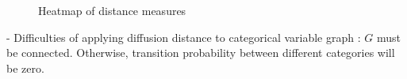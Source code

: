 \documentclass[12pt]{report}
\begin{document}
 
\begin{figure}[H]
\captionsetup{format=plain}
\centering
{}
\caption{Heatmap of distance measures}
\label{fig:dist}    
\end{figure} 
 
  
- Difficulties of applying diffusion distance to categorical variable graph : $G$ must be connected. Otherwise, transition probability between different categories will be zero.  

 
\end{document}
